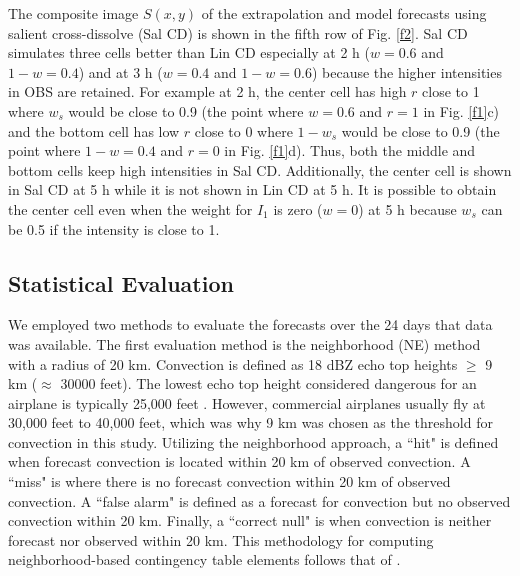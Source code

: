 \documentclass[12pt]{article}
\begin{document}
The composite image $S(x,y)$ of the extrapolation and model forecasts using salient cross-dissolve (Sal CD) is shown in the fifth row of Fig. \ref{f2}. Sal CD simulates three cells better than Lin CD especially at 2 h ($w=0.6$ and $1-w=0.4$) and at 3 h ($w=0.4$ and $1-w=0.6$) because the higher intensities in OBS are retained. For example at 2 h, the center cell has high $r $ close to 1 where $w_{s} $ would be close to 0.9 (the point where $w=0.6$ and $r =1$ in Fig. \ref{f1}c) and the bottom cell has low $r $ close to 0 where $1-w_{s} $ would be close to 0.9 (the point where $1-w=0.4$ and $r =0$ in Fig. \ref{f1}d). Thus, both the middle and bottom cells keep high intensities in Sal CD. Additionally, the center cell is shown in Sal CD at 5 h while it is not shown in Lin CD at 5 h. It is possible to obtain the center cell even when the weight for $I_{1}$ is zero ($w=0$) at 5 h because $w_{s} $ can be 0.5 if the intensity is close to 1. 

\subsection{Statistical Evaluation}
We employed two methods to evaluate the forecasts over the 24 days that data was available. The first evaluation method is the neighborhood (NE) method with a radius of 20 km. Convection is defined as 18 dBZ echo top heights $\ge$ 9 km ($\approx$ 30000 feet). The lowest echo top height considered dangerous for an airplane is typically 25,000 feet \citep{mat+10}. However, commercial airplanes usually fly at 30,000 feet to 40,000 feet, which was why 9 km was chosen as the threshold for convection in this study. Utilizing the neighborhood approach, a ``hit" is defined when forecast convection is located within 20 km of observed convection. A ``miss" is where there is no forecast convection within 20 km of observed convection. A ``false alarm" is defined as a forecast for convection but no observed convection within 20 km. Finally, a ``correct null" is when convection is neither forecast nor observed within 20 km. This methodology for computing neighborhood-based contingency table elements follows that of \citet{clark++10}.
\end{document}
